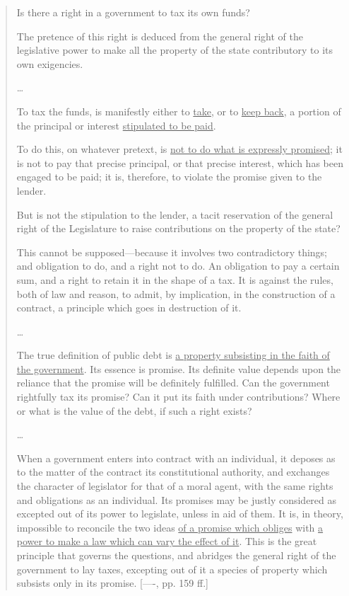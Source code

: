 \documentclass[12pt]{article}
\begin{document}
\begin{quote}
Is there a right in a government to tax its own funds?

The pretence of this right is deduced from the general right of the legislative power to make all the property of the state contributory to its own exigencies.

\ldots

To tax the funds, is manifestly either to \underline{take}, or to \underline{keep back}, a portion of the principal or interest \underline{stipulated to be paid}.

To do this, on whatever pretext, is \underline{not to do what is expressly promised}; it is not to pay that precise principal, or that precise interest, which has been engaged to be paid; it is, therefore, to violate the promise given to the lender.

But is not the stipulation to the lender, a tacit reservation of the general right of the Legislature to raise contributions on the property of the state?

This cannot be supposed---because it involves two contradictory things; and obligation to do, and a right not to do. An obligation to pay a certain sum, and a right to retain it in the shape of a tax. It is against the rules, both of law and reason, to admit, by implication, in the construction of a contract, a principle which goes in destruction of it.

\ldots

The true definition of public debt is \underline{a property subsisting in the faith of the government}. Its essence is promise. Its definite value depends upon the reliance that the promise will be definitely fulfilled. Can the government rightfully tax its promise? Can it put its faith under contributions? Where or what is the value of the debt, if such a right exists?

\ldots

When a government enters into contract with an individual, it deposes as to the matter of the contract its constitutional authority, and exchanges the character of legislator for that of a moral agent, with the same rights and obligations as an individual. Its promises may be justly considered as excepted out of its power to legislate, unless in aid of them. It is, in theory, impossible to reconcile the two ideas \underline{of a promise which obliges} with \underline{a power to make a law which can vary the effect of it}. This is the great principle that governs the questions, and abridges the general right of the government to lay taxes, excepting out of it a species of property which subsists only in its promise. [----, pp. 159 ff.]
\end{quote}
\end{document}
